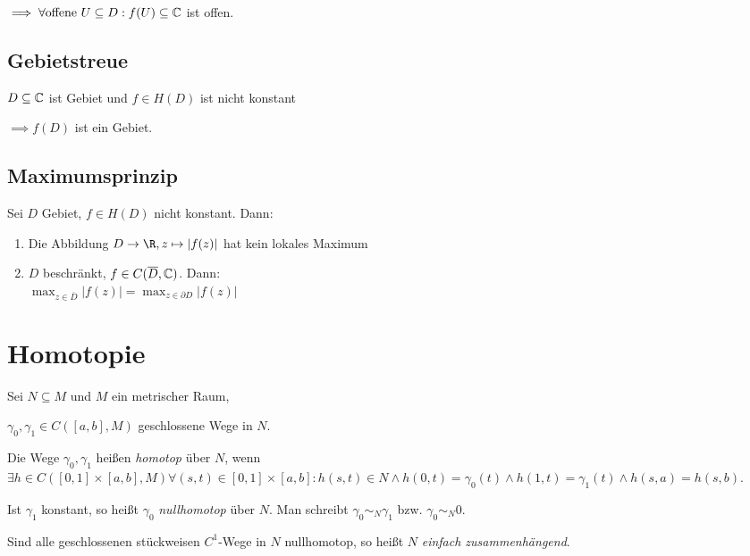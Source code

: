 $\implies \forall \text{offene } U \subseteq D : f(U) \subseteq \mathbb{C}$ ist offen.

\subsection*{Gebietstreue}

$D \subseteq \mathbb{C}$ ist Gebiet und $f \in H(D)$ ist nicht konstant

$\implies f(D)$ ist ein Gebiet.

\subsection*{Maximumsprinzip}

Sei $D$ Gebiet, $f \in H(D)$ nicht konstant. Dann:

\begin{enumerate}[label=(\alph*)]
	\item Die Abbildung $D \to \R, z \mapsto |f(z)|$ hat kein lokales Maximum
	\item $D$ beschränkt, $f \in C(\overline D,\mathbb{C})$. Dann: \\ $\max_{z \in \overline D} |f(z)| = \max_{z \in \partial D} |f(z)|$
\end{enumerate}

\section*{Homotopie}

Sei $N \subseteq M$ und $M$ ein metrischer Raum,

$\gamma_0, \gamma_1 \in C([a,b],M)$ geschlossene Wege in $N$.

\vspace*{1mm}

Die Wege $\gamma_0, \gamma_1$ heißen \emph{homotop} über $N$, wenn $\exists h \in C([0,1] \times [a,b],M) \forall (s,t) \in [0,1] \times [a,b] : h(s,t) \in N \land h(0,t)=\gamma_0(t) \land h(1,t) = \gamma_1(t) \land h(s,a) = h(s,b)$.

\vspace*{1mm}

Ist $\gamma_1$ konstant, so heißt $\gamma_0$ \emph{nullhomotop} über $N$. Man schreibt $\gamma_0 \sim_N \gamma_1$ bzw. $\gamma_0 \sim_N 0$.

\vspace*{1mm}

Sind alle geschlossenen stückweisen $C^1$-Wege in $N$ nullhomotop, so heißt $N$ \emph{einfach zusammenhängend}.

